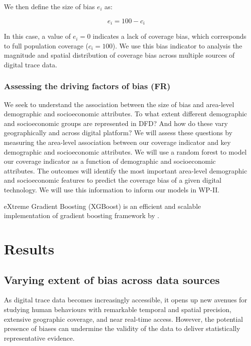 \documentclass[]{rsos}%
\begin{document}
We then define the size of bias \(e_i\) as:

\begin{equation} \label{eq:size-bias}
e_i = 100 - c_i
\end{equation}

In this case, a value of \(e_i = 0\) indicates a lack of coverage bias,
which corresponds to full population coverage (\(c_i = 100\)). We use this
bias indicator to analysis the magnitude and spatial distribution of
coverage bias across multiple sources of digital trace data.

\hypertarget{assessing-the-driving-factors-of-bias-fr}{%
\subsubsection{Assessing the driving factors of bias (FR)}\label{assessing-the-driving-factors-of-bias-fr}}

We seek to understand the association between the size of bias and
area-level demographic and socioeconomic attributes. To what extent
different demographic and socioeconomic groups are represented in DFD?
And how do these vary geographically and across digital platform? We
will assess these questions by measuring the area-level association
between our coverage indicator and key demographic and socioeconomic
attributes. We will use a random forest to model our coverage indicator
as a function of demographic and socioeconomic attributes. The outcomes
will identify the most important area-level demographic and
socioeconomic features to predict the coverage bias of a given digital
technology. We will use this information to inform our models in WP-II.

eXtreme Gradient Boosting (XGBoost) is an efficient and scalable
implementation of gradient boosting framework by \citep{friedman2001, friedman2000}.

\hypertarget{results}{%
\section{Results}\label{results}}

\hypertarget{varying-extent-of-bias-across-data-sources}{%
\subsection{Varying extent of bias across data sources}\label{varying-extent-of-bias-across-data-sources}}

As digital trace data becomes increasingly accessible, it opens up new
avenues for studying human behaviours with remarkable temporal and
spatial precision, extensive geographic coverage, and near real-time
access. However, the potential presence of biases can undermine the
validity of the data to deliver statistically representative evidence.
\end{document}

